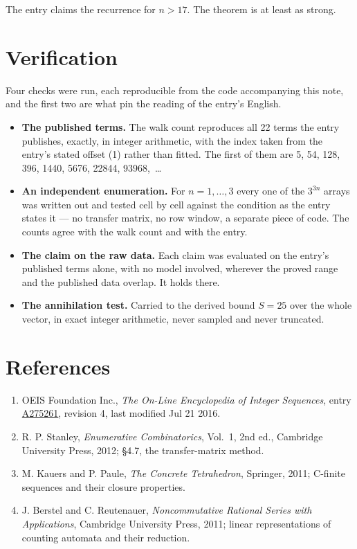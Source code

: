 \documentclass[11pt]{article}
\theoremstyle{definition}
\begin{document}
The entry claims the recurrence for $n > 17$. The theorem is at least as strong.

\section{Verification}

Four checks were run, each reproducible from the code accompanying this note, and the first two are what pin the reading of the entry's English.

\begin{itemize}

\item {\bfseries The published terms.} The walk count reproduces all 22 terms the entry publishes, exactly, in integer arithmetic, with the index taken from the entry's stated offset (1) rather than fitted. The first of them are 5, 54, 128, 396, 1440, 5676, 22844, 93968,~\dots

\item {\bfseries An independent enumeration.} For $n = 1,\dots,3$ every one of the $3^{3n}$ arrays was written out and tested cell by cell against the condition as the entry states it --- no transfer matrix, no row window, a separate piece of code. The counts agree with the walk count and with the entry.

\item {\bfseries The claim on the raw data.} Each claim was evaluated on the entry's published terms alone, with no model involved, wherever the proved range and the published data overlap. It holds there.

\item {\bfseries The annihilation test.} Carried to the derived bound $S = 25$ over the whole vector, in exact integer arithmetic, never sampled and never truncated.

\end{itemize}

\section{References}

\begin{enumerate}

\item OEIS Foundation Inc., \emph{The On-Line Encyclopedia of Integer Sequences}, entry \href{https://oeis.org/A275261}{A275261}, revision 4, last modified Jul 21 2016.

\item R. P. Stanley, \emph{Enumerative Combinatorics}, Vol.~1, 2nd ed., Cambridge University Press, 2012; \S4.7, the transfer-matrix method.

\item M. Kauers and P. Paule, \emph{The Concrete Tetrahedron}, Springer, 2011; C-finite sequences and their closure properties.

\item J. Berstel and C. Reutenauer, \emph{Noncommutative Rational Series with Applications}, Cambridge University Press, 2011; linear representations of counting automata and their reduction.

\end{enumerate}
\end{document}
